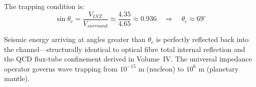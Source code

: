 The trapping condition is:
\begin{equation}
    \sin\theta_c = \frac{V_{LVZ}}{V_{surround}} \approx \frac{4.35}{4.65} \approx 0.936 \quad \Longrightarrow \quad \theta_c \approx 69^\circ
\end{equation}

Seismic energy arriving at angles greater than $\theta_c$ is perfectly reflected back into the channel---structurally identical to optical fibre total internal reflection and the QCD flux-tube confinement derived in Volume~IV. The universal impedance operator governs wave trapping from $10^{-15}$ m (nucleon) to $10^{6}$ m (planetary mantle).

